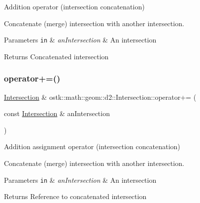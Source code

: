 Addition operator (intersection concatenation) 

Concatenate (merge) intersection with another intersection.


\begin{DoxyParams}[1]{Parameters}
\mbox{\tt in}  & {\em an\+Intersection} & An intersection \\
\hline
\end{DoxyParams}
\begin{DoxyReturn}{Returns}
Concatenated intersection 
\end{DoxyReturn}
\mbox{\label{classostk_1_1math_1_1geom_1_1d2_1_1_intersection_a5355afc449376582af8ff758dcbb3092}} 
\subsubsection{\texorpdfstring{operator+=()}{operator+=()}}
{\footnotesize\ttfamily \hyperlink{classostk_1_1math_1_1geom_1_1d2_1_1_intersection}{Intersection} \& ostk\+::math\+::geom\+::d2\+::\+Intersection\+::operator+= (\begin{DoxyParamCaption}\item[{const \hyperlink{classostk_1_1math_1_1geom_1_1d2_1_1_intersection}{Intersection} \&}]{an\+Intersection }\end{DoxyParamCaption})}



Addition assignment operator (intersection concatenation) 

Concatenate (merge) intersection with another intersection.


\begin{DoxyParams}[1]{Parameters}
\mbox{\tt in}  & {\em an\+Intersection} & An intersection \\
\hline
\end{DoxyParams}
\begin{DoxyReturn}{Returns}
Reference to concatenated intersection 
\end{DoxyReturn}
\mbox{\label{classostk_1_1math_1_1geom_1_1d2_1_1_intersection_aecdb671aaa9d6a56ec1209fe3035790e}} 
